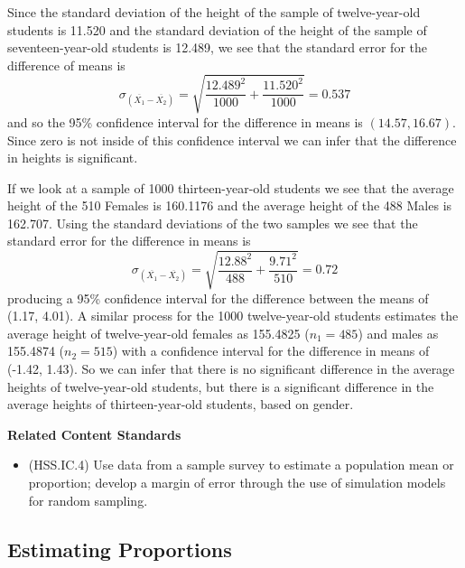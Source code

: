 \documentclass[
]{book}
\providecommand{\tightlist}{%
  \setlength{\itemsep}{0pt}\setlength{\parskip}{0pt}}
\newenvironment{standards}{}{}
\theoremstyle{definition}
\theoremstyle{definition}
\theoremstyle{definition}
\theoremstyle{definition}
\theoremstyle{remark}
\begin{document}
Since the standard deviation of the height of the sample of twelve-year-old students is 11.520 and the standard deviation of the height of the sample of seventeen-year-old students is 12.489, we see that the standard error for the difference of means is
\[\sigma_{(\overline{X_1}-\overline{X_2})} =  \sqrt{\frac{12.489^2}{1000} + \frac{11.520^2}{1000} } = 0.537\] and so the 95\% confidence interval for the difference in means is \((14.57, 16.67)\). Since zero is not inside of this confidence interval we can infer that the difference in heights is significant.

If we look at a sample of 1000 thirteen-year-old students we see that the average height of the 510 Females is 160.1176 and the average height of the 488 Males is 162.707. Using the standard deviations of the two samples we see that the standard error for the difference in means is
\[\sigma_{(\overline{X_1}-\overline{X_2})} = \sqrt{\frac{12.88^2}{488} + \frac{9.71^2}{510} } = 0.72\] producing a 95\% confidence interval for the difference between the means of (1.17, 4.01). A similar process for the 1000 twelve-year-old students estimates the average height of twelve-year-old females as 155.4825 (\(n_1=485\)) and males as 155.4874 (\(n_2=515\)) with a confidence interval for the difference in means of (-1.42, 1.43). So we can infer that there is no significant difference in the average heights of twelve-year-old students, but there is a significant difference in the average heights of thirteen-year-old students, based on gender.

\begin{standards}

\begin{center}
\textbf{Related Content Standards}

\end{center}

\begin{itemize}
\tightlist
\item
  (HSS.IC.4) Use data from a sample survey to estimate a population mean or proportion; develop a margin of error through the use of simulation models for random sampling.
\end{itemize}

\end{standards}

\hypertarget{estimating-proportions}{%
\subsection{Estimating Proportions}\label{estimating-proportions}}
\end{document}
